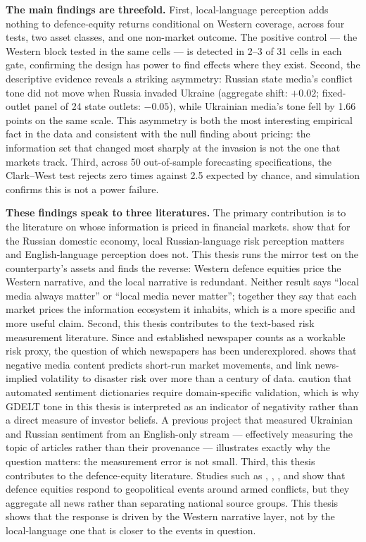 \documentclass[12pt,a4paper]{article}
\begin{document}
\textbf{The main findings are threefold.} First, local-language perception adds nothing to defence-equity returns conditional on Western coverage, across four tests, two asset classes, and one non-market outcome. The positive control --- the Western block tested in the same cells --- is detected in 2--3 of 31 cells in each gate, confirming the design has power to find effects where they exist. Second, the descriptive evidence reveals a striking asymmetry: Russian state media's conflict tone did not move when Russia invaded Ukraine (aggregate shift: $+0.02$; fixed-outlet panel of 24 state outlets: $-0.05$), while Ukrainian media's tone fell by 1.66 points on the same scale. This asymmetry is both the most interesting empirical fact in the data and consistent with the null finding about pricing: the information set that changed most sharply at the invasion is not the one that markets track. Third, across 50 out-of-sample forecasting specifications, the Clark--West test rejects zero times against 2.5 expected by chance, and simulation confirms this is not a power failure.

\textbf{These findings speak to three literatures.} The primary contribution is to the literature on whose information is priced in financial markets. \citet{bondarenko2024} show that for the Russian domestic economy, local Russian-language risk perception matters and English-language perception does not. This thesis runs the mirror test on the counterparty's assets and finds the reverse: Western defence equities price the Western narrative, and the local narrative is redundant. Neither result says ``local media always matter'' or ``local media never matter''; together they say that each market prices the information ecosystem it inhabits, which is a more specific and more useful claim. Second, this thesis contributes to the text-based risk measurement literature. Since \citet{baker2016} and \citet{caldara2022} established newspaper counts as a workable risk proxy, the question of which newspapers has been underexplored. \citet{tetlock2007media} shows that negative media content predicts short-run market movements, and \citet{manela2017} link news-implied volatility to disaster risk over more than a century of data. \citet{loughran2011textual} caution that automated sentiment dictionaries require domain-specific validation, which is why GDELT tone in this thesis is interpreted as an indicator of negativity rather than a direct measure of investor beliefs. A previous project that measured Ukrainian and Russian sentiment from an English-only stream --- effectively measuring the topic of articles rather than their provenance --- illustrates exactly why the question matters: the measurement error is not small. Third, this thesis contributes to the defence-equity literature. Studies such as \citet{apergis2018defense}, \citet{zhang2022race}, \citet{covachev2024europe}, and \citet{klomp2025hamas} show that defence equities respond to geopolitical events around armed conflicts, but they aggregate all news rather than separating national source groups. This thesis shows that the response is driven by the Western narrative layer, not by the local-language one that is closer to the events in question.
\end{document}

